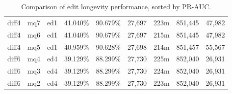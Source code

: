 \begin{sidewaystable}[!ph]
\begin{center}
\begin{tabular}{|c|c|c||c|c||c|c|c|c|}
diff4 & mq7 & ed1 & 41.040\% & 90.679\% & 27,697 & 223m & 851,445 & 47,982 \\
diff4 & mq6 & ed1 & 41.040\% & 90.679\% & 27,697 & 215m & 851,445 & 47,982 \\
diff4 & mq5 & ed1 & 40.959\% & 90.628\% & 27,698 & 214m & 851,457 & 55,567 \\
diff6 & mq4 & ed4 & 39.129\% & 88.299\% & 27,730 & 225m & 852,040 & 26,931 \\
diff6 & mq3 & ed4 & 39.129\% & 88.299\% & 27,730 & 224m & 852,040 & 26,931 \\
diff6 & mq2 & ed4 & 39.129\% & 88.299\% & 27,730 & 223m & 852,040 & 26,931 \\
\hline
\end{tabular}
\end{center}
\caption{Comparison of edit longevity performance,
    sorted by PR-AUC.}
\label{tab:editshoutG}
\end{sidewaystable}
\clearpage
